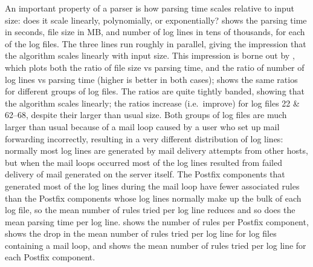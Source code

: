 An important property of a parser is how parsing time scales relative to
input size: does it scale linearly, polynomially, or exponentially?
 shows the
parsing time in seconds, file size in MB, and number of log lines in tens
of thousands, for each of the \numberOFlogFILES{} log files.  The three
lines run roughly in parallel, giving the impression that the algorithm
scales linearly with input size.  This impression is borne out by
, which
plots both the ratio of file size vs parsing time, and the ratio of number
of log lines vs parsing time (higher is better in both cases);
shows the same ratios for different groups of log files.  The ratios are
quite tightly banded, showing that the algorithm scales linearly; the
ratios increase (i.e.\ improve) for log files 22 \& 62--68, despite their
larger than usual size.  Both groups of log files are much larger than
usual because of a mail loop caused by a user who set up mail forwarding
incorrectly, resulting in a very different distribution of log lines:
normally most log lines are generated by mail delivery attempts from other
hosts, but when the mail loops occurred most of the log lines resulted from
failed delivery of mail generated on the server itself.  The Postfix
components that generated most of the log lines during the mail loop have
fewer associated rules than the Postfix components whose log lines normally
make up the bulk of each log file, so the mean number of rules tried per
log line reduces and so does the mean parsing time per log line.
 shows the number of rules
per Postfix component, 
shows the drop in the mean number of rules tried per log line for log files
containing a mail loop, and  shows the mean number of rules tried per
log line for each Postfix component.



